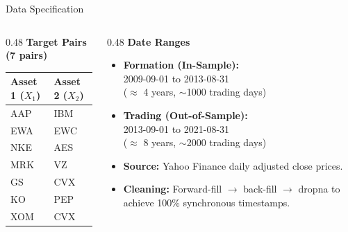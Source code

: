 \documentclass[10pt, aspectratio=169]{beamer}
\begin{document}
\begin{frame}{Data Specification}
  \begin{columns}[T]
    \begin{column}{0.48\textwidth}
      \textbf{Target Pairs (7 pairs)}
      \vspace{4pt}
      \begin{table}[h]
        \centering\small
        \begin{tabular}{@{}ll@{}}
          \toprule
          Asset 1 ($X_1$) & Asset 2 ($X_2$) \\
          \midrule
          AAP  & IBM \\
          EWA  & EWC \\
          NKE  & AES \\
          MRK  & VZ  \\
          GS   & CVX \\
          KO   & PEP \\
          XOM  & CVX \\
          \bottomrule
        \end{tabular}
      \end{table}
    \end{column}
    \begin{column}{0.48\textwidth}
      \textbf{Date Ranges}
      \vspace{4pt}
      \begin{itemize}
        \item \textbf{Formation (In-Sample):}\\
              2009-09-01 to 2013-08-31\\
              ($\approx$ 4 years, $\sim$1000 trading days)
        \item \textbf{Trading (Out-of-Sample):}\\
              2013-09-01 to 2021-08-31\\
              ($\approx$ 8 years, $\sim$2000 trading days)
        \item \textbf{Source:} Yahoo Finance daily adjusted close prices.
        \item \textbf{Cleaning:} Forward-fill $\to$ back-fill $\to$ dropna
              to achieve 100\% synchronous timestamps.
      \end{itemize}
    \end{column}
  \end{columns}
\end{frame}
\end{document}
